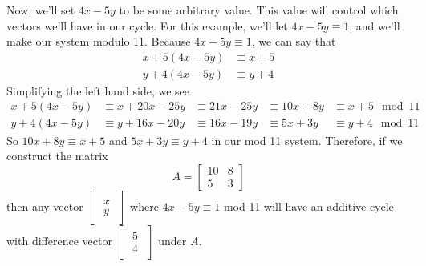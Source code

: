 \documentclass[a4paper, 12pt, reqno]{amsart}
\begin{document}
			Now, we'll set $4x - 5y$ to be some arbitrary value. This value will control which vectors we'll have in
			our cycle. For this example, we'll let $4x - 5y \equiv 1$, and we'll make our system modulo 11. Because
			$4x - 5y \equiv 1$, we can say that
			\begin{align*}
				x + 5(4x - 5y) &\equiv x + 5 \\
				y + 4(4x - 5y) &\equiv y + 4
			\end{align*}
			Simplifying the left hand side, we see
			\begin{align*}
				x + 5(4x - 5y) &\equiv x + 20x - 25y &\equiv 21x - 25y &\equiv 10x + 8y &\equiv x + 5 \mod{11} \\
				y + 4(4x - 5y) &\equiv y + 16x - 20y &\equiv 16x - 19y &\equiv  5x + 3y &\equiv y + 4 \mod{11}
			\end{align*}
			So $10x + 8y \equiv x + 5$ and $5x + 3y \equiv y + 4$ in our mod 11 system. Therefore, if we construct 
			the matrix
			\[
				A = 
				\begin{bmatrix}
					10 & 8 \\
					 5 & 3
				\end{bmatrix}
			\]
			then any vector 
			$
				\begin{bmatrix}
					\begin{smallmatrix}
						x \\
						y
					\end{smallmatrix}
				\end{bmatrix}
			$
			where $4x - 5y \equiv 1$ mod 11 will have an additive cycle with difference vector
			$
				\begin{bmatrix}
					\begin{smallmatrix}
						5 \\
						4
					\end{smallmatrix}
				\end{bmatrix}
			$
			under $A$.
			
\end{document}
